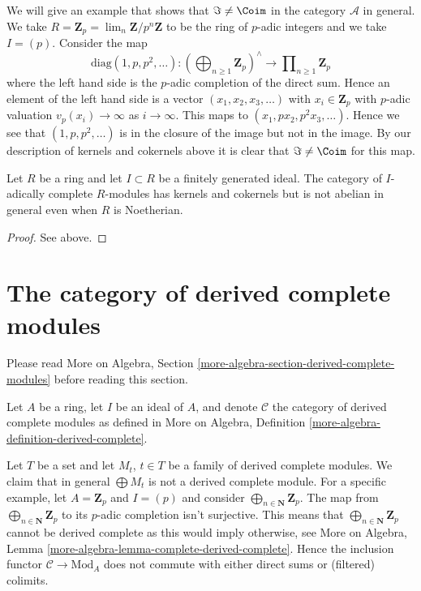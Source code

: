 \noindent
We will give an example that shows that $\Im \not = \Coim$ in the
category $\mathcal{A}$ in general. We take
$R = \mathbf{Z}_p = \lim_n \mathbf{Z}/p^n\mathbf{Z}$
to be the ring of $p$-adic integers and we take $I = (p)$.
Consider the map
$$
\text{diag}(1, p, p^2, \ldots) :
\left(\bigoplus\nolimits_{n \geq 1} \mathbf{Z}_p\right)^\wedge
\longrightarrow
\prod\nolimits_{n \geq 1} \mathbf{Z}_p
$$
where the left hand side is the $p$-adic completion of the direct sum.
Hence an element of the left hand side is a vector $(x_1, x_2, x_3, \ldots)$
with $x_i \in \mathbf{Z}_p$ with $p$-adic valuation $v_p(x_i) \to \infty$ as
$i \to \infty$. This maps to $(x_1, px_2, p^2x_3, \ldots)$. Hence we see
that $(1, p, p^2, \ldots)$ is in the closure of the image but not in
the image. By our description of kernels and cokernels above it is
clear that $\Im \not = \Coim$ for this map.

\begin{lemma}
\label{lemma-complete-modules-not-abelian}
Let $R$ be a ring and let $I \subset R$ be a finitely generated ideal.
The category of $I$-adically complete $R$-modules has kernels and
cokernels but is not abelian in general even when $R$ is Noetherian.
\end{lemma}

\begin{proof}
See above.
\end{proof}





\section{The category of derived complete modules}
\label{section-derived-complete-modules}

\noindent
Please read More on Algebra, Section
\ref{more-algebra-section-derived-complete-modules}
before reading this section.

\medskip\noindent
Let $A$ be a ring, let $I$ be an ideal of $A$, and denote $\mathcal{C}$
the category of derived complete modules as defined in
More on Algebra, Definition \ref{more-algebra-definition-derived-complete}.

\medskip\noindent
Let $T$ be a set and let $M_t$, $t \in T$ be a family of derived complete
modules. We claim that in general $\bigoplus M_t$ is not a derived complete
module. For a specific example, let $A = \mathbf{Z}_p$ and $I = (p)$ and
consider $\bigoplus_{n \in \mathbf{N}} \mathbf{Z}_p$. The map from
$\bigoplus_{n \in \mathbf{N}} \mathbf{Z}_p$ to its $p$-adic completion
isn't surjective. This means that $\bigoplus_{n \in \mathbf{N}} \mathbf{Z}_p$
cannot be derived complete as this would imply otherwise, see
More on Algebra, Lemma \ref{more-algebra-lemma-complete-derived-complete}.
Hence the inclusion functor $\mathcal{C} \to \text{Mod}_A$ does not commute
with either direct sums or (filtered) colimits.

